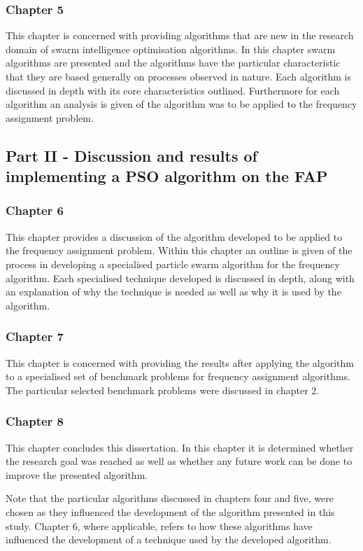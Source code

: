 \subsubsection{Chapter 5}
This chapter is concerned with providing algorithms that are new in the research domain of swarm intelligence optimisation algorithms. In this chapter swarm algorithms are presented and the algorithms have the particular characteristic that they are based generally on processes observed in nature. Each algorithm is discussed in depth with its core characteristics outlined. Furthermore for each algorithm an analysis is given of the algorithm was to be applied to the frequency assignment problem.
\subsection{Part II - Discussion and results of implementing a PSO algorithm on the FAP}
\subsubsection{Chapter 6}
This chapter provides a discussion of the algorithm developed to be applied to the frequency assignment problem. Within this chapter an outline is given of the process in developing a specialised particle swarm algorithm for the frequency algorithm. Each specialised technique developed is discussed in depth, along with an explanation of why the technique is needed as well as why it is used by the algorithm.
\subsubsection{Chapter 7}
This chapter is concerned with providing the results after applying the algorithm to a specialised set of benchmark problems for frequency assignment algorithms. The particular selected benchmark problems were discussed in chapter 2.
\subsubsection{Chapter 8}
This chapter concludes this dissertation. In this chapter it is determined whether the research goal was reached as well as whether any future work can be done to improve the presented algorithm.

Note that the particular algorithms discussed in chapters four and five, were chosen as they influenced the development of the algorithm presented in this study. Chapter 6, where applicable, refers to how these algorithms have influenced the development of a technique used by the developed algorithm.
